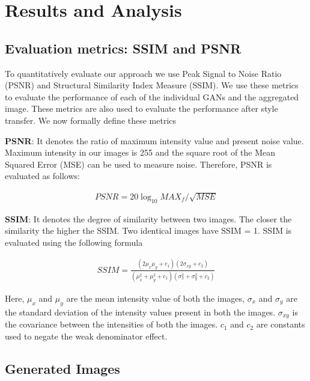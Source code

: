 \documentclass[10pt,journal,compsoc]{IEEEtran}
\begin{document}
\section{Results and Analysis}

\subsection{Evaluation metrics: SSIM and PSNR}

To quantitatively evaluate our approach we use Peak Signal to Noise Ratio (PSNR) and Structural Similarity Index Measure (SSIM). We use these metrics to evaluate the
performance of each of the individual GANs and the aggregated image. These metrics are also used to evaluate the performance after style transfer. We now formally define
these metrics

\textbf{PSNR}: It denotes the ratio of maximum intensity value and present noise value. Maximum intensity in our images is 255 and the square root of the Mean Squared
Error (MSE) can be used to measure noise. Therefore, PSNR is evaluated as follows:

\begin{align}
  PSNR = 20 \log_{10} MAX_f / \sqrt{MSE}
\end{align}

\textbf{SSIM}: It denotes the degree of similarity between two images. The closer the similarity the higher the SSIM. Two identical images have SSIM = 1.
SSIM is evaluated using the following formula

\begin{align}
  SSIM = \frac{(2 \mu_x \mu_y + c_1) (2 \sigma_{xy} + c_2)}{(\mu_x^2 + \mu_y^2 + c_1) (\sigma_x^2 + \sigma_y^2 + c_2)}
\end{align}

Here, $\mu_x$ and $\mu_y$ are the mean intensity value of both the images, $\sigma_x$ and $\sigma_y$ are the standard deviation of the intensity values present in both
the images. $\sigma_{xy}$ is the covariance between the intensities of both the images. $c_1$ and $c_2$ are constants used to negate the weak denominator effect.

\subsection{Generated Images}
\end{document}
